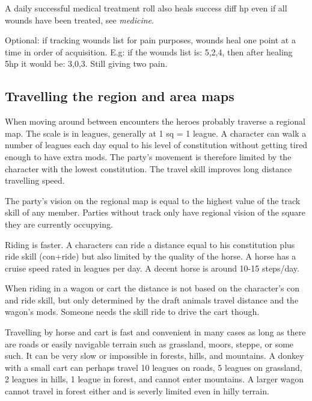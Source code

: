A daily successful medical treatment roll also heals success diff hp even if all wounds have been treated, see \emph{medicine}.

Optional: if tracking wounds list for pain purposes, wounds heal one point at a time in order of acquisition. E.g: if the wounds list is: 5,2,4, then after healing 5hp it would be: 3,0,3. Still giving two pain.


\subsection*{Travelling the region and area maps}
When moving around between encounters the heroes probably traverse a regional map. The scale is in leagues, generally at 1 sq = 1 league. A character can walk a number of leagues each day equal to his level of constitution without getting tired enough to have extra mods. The party's movement is therefore limited by the character with the lowest constitution. The travel skill improves long distance travelling speed.

The party's vision on the regional map is equal to the highest value of the track skill of any member. Parties without track only have regional vision of the square they are currently occupying.

Riding is faster. A characters can ride a distance equal to his constitution plus ride skill (con+ride) but also limited by the quality of the horse. A horse has a cruise speed rated in leagues per day. A decent horse is around 10-15 steps/day.

When riding in a wagon or cart the distance is not based on the character's con and ride skill, but only determined by the draft animals travel distance and the wagon's mods. Someone needs the skill ride to drive the cart though.

Travelling by horse and cart is fast and convenient in many cases as long as there are roads or easily navigable terrain such as grassland, moors, steppe, or some such. It can be very slow or impossible in forests, hills, and mountains. A donkey with a small cart can perhaps travel 10 leagues on roads, 5 leagues on grassland, 2 leagues in hills, 1 league in forest, and cannot enter mountains. A larger wagon cannot travel in forest either and is severly limited even in hilly terrain.


%

